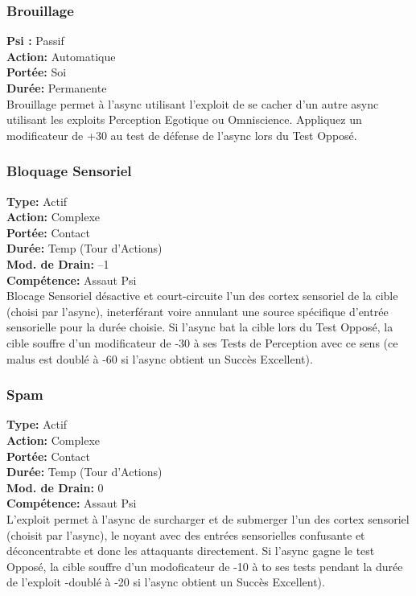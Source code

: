 \subsubsection{Brouillage} \textbf{Psi :} Passif \\ \textbf{Action:} Automatique \\ \textbf{Portée:} Soi \\ \textbf{Durée:} Permanente \\ Brouillage permet à l'async utilisant l'exploit de se cacher d'un autre async utilisant les exploits Perception Egotique ou Omniscience. Appliquez un modificateur de +30 au test de défense de l'async lors du Test Opposé. 

\subsubsection{Bloquage Sensoriel} \textbf{Type:} Actif \\ \textbf{Action:} Complexe \\ \textbf{Portée:} Contact \\ \textbf{Durée:} Temp (Tour d'Actions) \\ \textbf{Mod. de Drain:} –1 \\ \textbf{Compétence:} Assaut Psi \\ Blocage Sensoriel désactive et court-circuite l'un des cortex sensoriel de la cible (choisi par l'async), ineterférant voire annulant une source spécifique d'entrée sensorielle pour la durée choisie. Si l'async bat la cible lors du Test Opposé, la cible souffre d'un modificateur de -30 à ses Tests de Perception avec ce sens (ce malus est doublé à -60 si l'async obtient un Succès Excellent). 

\subsubsection{Spam} \textbf{Type:} Actif \\ \textbf{Action:} Complexe \\ \textbf{Portée:} Contact \\ \textbf{Durée:} Temp (Tour d'Actions) \\ \textbf{Mod. de Drain:} 0 \\ \textbf{Compétence:} Assaut Psi \\ L'exploit permet à l'async de surcharger et de submerger l'un des cortex sensoriel (choisit par l'async), le noyant avec des entrées sensorielles confusante et déconcentrabte et donc les attaquants directement. Si l'async gagne le test Opposé, la cible souffre d'un modoficateur de -10 à to ses tests pendant la durée de l'exploit -doublé à -20 si l'async obtient un Succès Excellent). 

